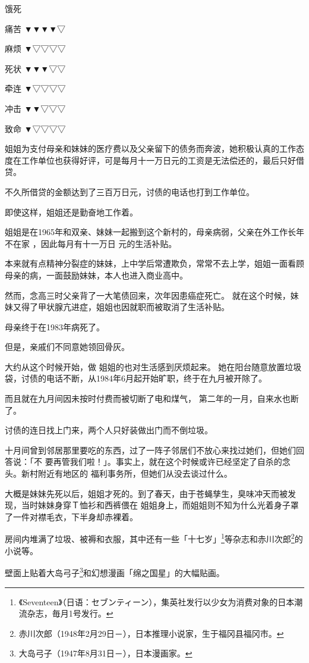 \documentclass[UTF8]{ctexart}
\begin{document}
饿死

痛苦 ▼▼▼▼▽

麻烦 ▼▽▽▽▽

死状 ▼▼▼▽▽

牵连 ▼▽▽▽▽

冲击 ▼▼▽▽▽

致命 ▼▽▽▽▽

姐姐为支付母亲和妹妹的医疗费以及父亲留下的债务而奔波，她积极认真的工作态度在工作单位也获得好评，可是每月十一万日元的工资是无法偿还的，最后只好借贷。

不久所借贷的金额达到了三百万日元，讨债的电话也打到工作单位。

即使这样，姐姐还是勤奋地工作着。

姐姐是在1965年和双亲、妹妹一起搬到这个新村的，母亲病弱，父亲在外工作长年不在家 ，因此每月有十一万日 元的生活补贴。

本来就有点精神分裂症的妹妹，上中学后常遭欺负，常常不去上学，姐姐一面看顾母亲的病，一面鼓励妹妹，本人也进入商业高中。

然而，念高三时父亲背了一大笔债回来，次年因患癌症死亡。
就在这个时候，妹妹又得了甲状腺亢进症，姐姐也因就职而被取消了生活补贴。 

母亲终于在1983年病死了。

但是，亲戚们不同意她领回骨灰。

大约从这个时候开始，做 姐姐的也对生活感到厌烦起来。
她在阳台随意放置垃圾袋，讨债的电话不断，从1984年6月起开始旷职，终于在九月被开除了。

而且就在九月间因未按时付费而被切断了电和煤气， 第二年的一月，自来水也断了。

讨债的连日找上门来，两个人只好装做出门而不倒垃圾。

十月间曾到邻居那里要吃的东西，过了一阵子邻居们不放心来找过她们，但她们回答说：「不 要再管我们啦！」。事实上，就在这个时候或许已经坚定了自杀的念头。新村附近有地区的 福利事务所，但她们从没去谈过什么。

大概是妹妹先死以后，姐姐才死的。到了春天，由于苍蝇孳生，臭味冲天而被发现，当时妹妹身穿Ｔ恤衫和西裤偎在 姐姐身上，而姐姐则不知为什么光着身子罩了一件对襟毛衣，下半身却赤裸着。

房间内堆满了垃圾、被褥和衣服，其中还有一些「十七岁」\footnote{《Seventeen》（日语：セブンティーン），集英社发行以少女为消费对象的日本潮流杂志，毎月1号发行。}等杂志和赤川次郎\footnote{赤川次郎（1948年2月29日－\qquad \qquad），日本推理小说家，生于福冈县福冈市。}的小说等。

壁面上贴着大岛弓子\footnote{大岛弓子（1947年8月31日－\qquad \qquad ），日本漫画家。}和幻想漫画「绵之国星」的大幅贴画。
\end{document}
